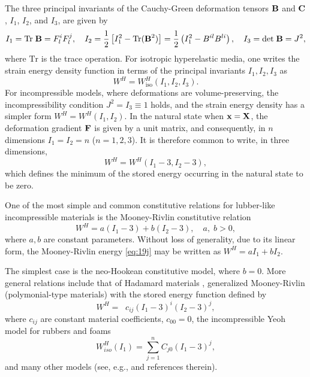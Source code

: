 \documentclass[11pt,letter,subeqn,fleqn]{article}
\numberwithin{equation}{section}
\numberwithin{table}{section}
\numberwithin{figure}{section}
\def\vec#1{{\boldsymbol{\rm #1}}} %
\def\tens#1{{\boldsymbol{\rm #1}}} %
\def\vec#1{{\boldsymbol{\rm #1}}} %
\def\tens#1{{\boldsymbol{\rm #1}}} %
\begin{document}
The three principal invariants of the Cauchy-Green deformation tensors $\tens{B}$ and $\tens{C}$, $I_1$, $I_2$, and $I_3$, are given by
 	\begin{equation}\label{eq:19g}
 	I_1=\mathrm{Tr}\;\tens{B}=F^{i}_{l}F^{j}_{l}, \quad
 	I_2=\frac{1}{2}\left[I^2_1-\mathrm{Tr}(\vec{B}^2)\right]=\frac{1}{2}\left(I^2_{1}-{B}^{il}B^{li}\right), \quad
 	I_3=\mathrm{det}\;\tens{B}=J^2,
 	\end{equation}
where $\mathrm{Tr}$ is the trace operation.  For isotropic hyperelastic media, one writes the strain energy density function in terms of the principal invariants $I_{1}, I_{2}, I_{3}$ as
\begin{equation}\label{eq:19a}
 W^{H}=W^{H}_\mathrm{iso}\left(I_{1}, I_{2}, I_{3}\right).
\end{equation}
For incompressible models, where deformations are volume-preserving, the incompressibility condition $J^2=I_{3}\equiv 1$ holds, and the strain energy density has a simpler form $W^{H}=W^{H}(I_1, I_2)$. In the natural state when $\vec{x}=\vec{X}$, the deformation gradient $\tens{F}$ is given by a unit matrix, and consequently, in $n$ dimensions $I_{1}=I_{2}=n$ ($n=1,2,3$). It is therefore common to write, in three dimensions,
\begin{equation}\label{eq:W:inc:3D}
 W^{H}=W^{H}\left(I_{1}-3, I_{2}-3\right),
\end{equation}
which defines the minimum of the stored energy occurring in the natural state to be zero.


\medskip One of the most simple and common constitutive relations for lubber-like incompressible materials is the Mooney-Rivlin constitutive relation
\begin{equation}\label{eq:19j}
W^{H}=a(I_{1}-3)+b(I_2-3),\quad  a,\;b >0,
\end{equation}
where $a,b$ are constant parameters. Without loss of generality, due to its linear form, the Mooney-Rivlin energy \eqref{eq:19j} may be written as $W^{H}=aI_{1}+bI_2$.

The simplest case is the neo-Hookean constitutive model, where $b=0$. More general relations include that of Hadamard materials \cite{ciarlet1988mathematical}, generalized Mooney-Rivlin (polymonial-type materials) \cite{hartmann2001parameter} with the stored energy function defined by
\begin{equation}\label{eq:20a11}
W^{H}=\mathop{\sum_{i=0}^{k}\sum_{j=0}^{l}} c_{ij}(I_1-3)^{i}(I_2-3)^{j},
\end{equation}
where $c_{ij}$ are constant material coefficients, $c_{00}=0$, the incompressible Yeoh model for rubbers and foams \cite{yeoh1993some}
\begin{equation}\label{Y1}
W^{H}_{iso}(I_{1})=\sum_{j=1}^{n} C_{j0}\left(I_{1}-3\right)^{j},
\end{equation}
and many other models (see, e.g., \cite{AgyThesis2020, cheviakov2012symmetry} and references therein).
\end{document}
